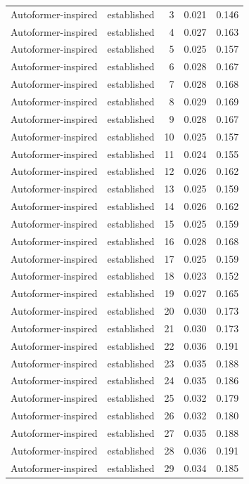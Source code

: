 \begin{tabular}{llrrr}
Autoformer-inspired & established & 3 & 0.021 & 0.146 \\
Autoformer-inspired & established & 4 & 0.027 & 0.163 \\
Autoformer-inspired & established & 5 & 0.025 & 0.157 \\
Autoformer-inspired & established & 6 & 0.028 & 0.167 \\
Autoformer-inspired & established & 7 & 0.028 & 0.168 \\
Autoformer-inspired & established & 8 & 0.029 & 0.169 \\
Autoformer-inspired & established & 9 & 0.028 & 0.167 \\
Autoformer-inspired & established & 10 & 0.025 & 0.157 \\
Autoformer-inspired & established & 11 & 0.024 & 0.155 \\
Autoformer-inspired & established & 12 & 0.026 & 0.162 \\
Autoformer-inspired & established & 13 & 0.025 & 0.159 \\
Autoformer-inspired & established & 14 & 0.026 & 0.162 \\
Autoformer-inspired & established & 15 & 0.025 & 0.159 \\
Autoformer-inspired & established & 16 & 0.028 & 0.168 \\
Autoformer-inspired & established & 17 & 0.025 & 0.159 \\
Autoformer-inspired & established & 18 & 0.023 & 0.152 \\
Autoformer-inspired & established & 19 & 0.027 & 0.165 \\
Autoformer-inspired & established & 20 & 0.030 & 0.173 \\
Autoformer-inspired & established & 21 & 0.030 & 0.173 \\
Autoformer-inspired & established & 22 & 0.036 & 0.191 \\
Autoformer-inspired & established & 23 & 0.035 & 0.188 \\
Autoformer-inspired & established & 24 & 0.035 & 0.186 \\
Autoformer-inspired & established & 25 & 0.032 & 0.179 \\
Autoformer-inspired & established & 26 & 0.032 & 0.180 \\
Autoformer-inspired & established & 27 & 0.035 & 0.188 \\
Autoformer-inspired & established & 28 & 0.036 & 0.191 \\
Autoformer-inspired & established & 29 & 0.034 & 0.185 \\

\end{tabular}
